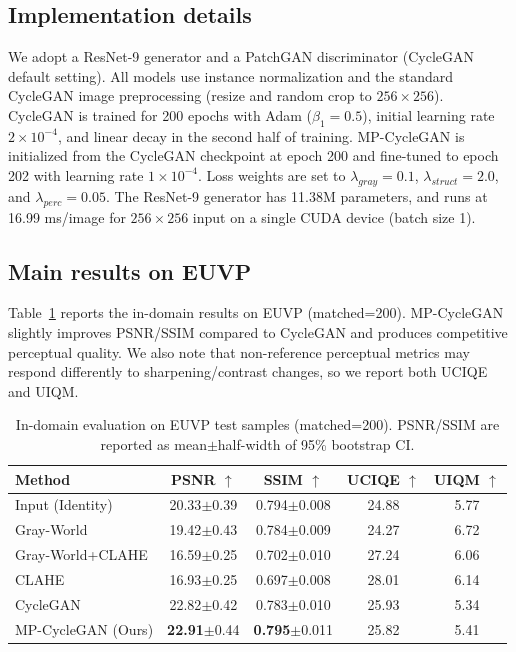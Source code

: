 \documentclass{article}
\begin{document}
\subsection{Implementation details}
We adopt a ResNet-9 generator and a PatchGAN discriminator (CycleGAN default setting).
All models use instance normalization and the standard CycleGAN image preprocessing (resize and random crop to $256{\times}256$).
CycleGAN is trained for 200 epochs with Adam ($\beta_1{=}0.5$), initial learning rate $2\times 10^{-4}$, and linear decay in the second half of training.
MP-CycleGAN is initialized from the CycleGAN checkpoint at epoch 200 and fine-tuned to epoch 202 with learning rate $1\times 10^{-4}$.
Loss weights are set to $\lambda_{gray}{=}0.1$, $\lambda_{struct}{=}2.0$, and $\lambda_{perc}{=}0.05$.
The ResNet-9 generator has 11.38M parameters, and runs at 16.99 ms/image for $256{\times}256$ input on a single CUDA device (batch size 1).

\subsection{Main results on EUVP}
Table~\ref{tab:euvp} reports the in-domain results on EUVP (matched=200).
MP-CycleGAN slightly improves PSNR/SSIM compared to CycleGAN and produces competitive perceptual quality.
We also note that non-reference perceptual metrics may respond differently to sharpening/contrast changes, so we report both UCIQE and UIQM.

\begin{table}[t]
\centering
\caption{In-domain evaluation on EUVP test samples (matched=200). PSNR/SSIM are reported as mean$\pm$half-width of 95\% bootstrap CI.}
\label{tab:euvp}
\small
\setlength{\tabcolsep}{4pt}
\begin{tabular}{lcccc}
\toprule
Method & PSNR $\uparrow$ & SSIM $\uparrow$ & UCIQE $\uparrow$ & UIQM $\uparrow$\\
\midrule
Input (Identity) & 20.33$\pm$0.39 & 0.794$\pm$0.008 & 24.88 & 5.77 \\
Gray-World & 19.42$\pm$0.43 & 0.784$\pm$0.009 & 24.27 & 6.72 \\
Gray-World+CLAHE & 16.59$\pm$0.25 & 0.702$\pm$0.010 & 27.24 & 6.06 \\
CLAHE & 16.93$\pm$0.25 & 0.697$\pm$0.008 & 28.01 & 6.14 \\
CycleGAN & 22.82$\pm$0.42 & 0.783$\pm$0.010 & 25.93 & 5.34 \\
MP-CycleGAN (Ours) & \textbf{22.91}$\pm$0.44 & \textbf{0.795}$\pm$0.011 & 25.82 & 5.41 \\
\bottomrule
\end{tabular}
\end{table}
\end{document}
